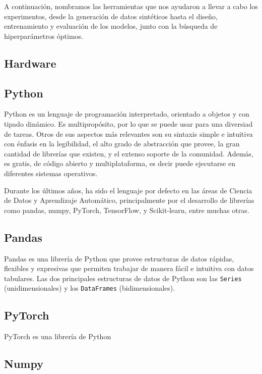 \documentclass[../../main.tex]{subfiles}
\begin{document}
A continuación, nombramos las herramientas que nos ayudaron a llevar a cabo los
experimentos, desde la generación de datos sintéticos hasta el diseño, entrenamiento y
evaluación de los modelos, junto con la búsqueda de hiperparámetros óptimos.

\subsection{Hardware}

\subsection{Python}
Python es un lenguaje de programación interpretado, orientado a objetos y con tipado
dinámico. Es multipropósito, por lo que se puede usar para una diversiad de tareas. Otros
de sus aspectos más relevantes son su sintaxis simple e intuitiva con énfasis en la
legibilidad, el alto grado de abstracción que provee, la gran cantidad de librerías que
existen, y el extenso soporte de la comunidad. Además, es gratis, de código abierto y
multiplataforma, es decir puede ejecutarse en diferentes sistemas operativos.

Durante los últimos años, ha sido el lenguaje por defecto en las áreas de Ciencia
de Datos y Aprendizaje Automático, principalmente por el desarrollo de librerías
como pandas, numpy, PyTorch, TensorFlow, y Scikit-learn, entre muchas otras.

\subsection{Pandas}
Pandas es una librería de Python que provee estructuras de datos rápidas, flexibles y
expresivas que permiten trabajar de manera fácil e intuitiva con datos tabulares. Las dos
principales estructuras de datos de Python son las \texttt{Series} (unidimensionales) y
los \texttt{DataFrames} (bidimensionales).

\subsection{PyTorch}
PyTorch es una librería de Python 



\subsection{Numpy}
\end{document}
